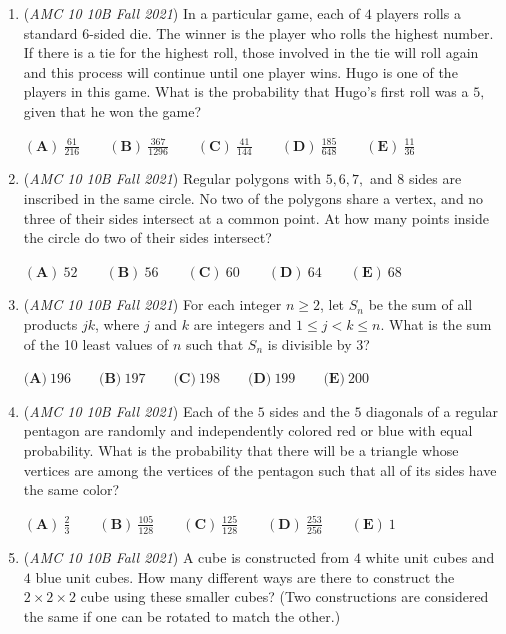 \begin{enumerate}
	\item (\textit{AMC 10 10B Fall 2021}) In a particular game, each of $4$ players rolls a standard $6{ }$-sided die. The winner is the player who rolls the highest number. If there is a tie for the highest roll, those involved in the tie will roll again and this process will continue until one player wins. Hugo is one of the players in this game. What is the probability that Hugo's first roll was a $5,$ given that he won the game?


 $(\textbf{A})\: \frac{61}{216}\qquad(\textbf{B}) \: \frac{367}{1296}\qquad(\textbf{C}) \: \frac{41}{144}\qquad(\textbf{D}) \: \frac{185}{648}\qquad(\textbf{E}) \: \frac{11}{36}$


	\item (\textit{AMC 10 10B Fall 2021}) Regular polygons with $5,6,7,$ and $8$ sides are inscribed in the same circle. No two of the polygons share a vertex, and no three of their sides intersect at a common point. At how many points inside the circle do two of their sides intersect?


 $(\textbf{A})\: 52\qquad(\textbf{B}) \: 56\qquad(\textbf{C}) \: 60\qquad(\textbf{D}) \: 64\qquad(\textbf{E}) \: 68$


	\item (\textit{AMC 10 10B Fall 2021}) For each integer $n\geq 2$, let $S_n$ be the sum of all products $jk$, where $j$ and $k$ are integers and $1\leq j<k\leq n$. What is the sum of the 10 least values of $n$ such that $S_n$ is divisible by $3$?


 $\textbf{(A)}\ 196 \qquad\textbf{(B)}\ 197 \qquad\textbf{(C)}\ 198 \qquad\textbf{(D)}\ 199 \qquad\textbf{(E)}\ 200$


	\item (\textit{AMC 10 10B Fall 2021}) Each of the $5{ }$ sides and the $5{ }$ diagonals of a regular pentagon are randomly and independently colored red or blue with equal probability. What is the probability that there will be a triangle whose vertices are among the vertices of the pentagon such that all of its sides have the same color?


 $(\textbf{A})\: \frac23\qquad(\textbf{B}) \: \frac{105}{128}\qquad(\textbf{C}) \: \frac{125}{128}\qquad(\textbf{D}) \: \frac{253}{256}\qquad(\textbf{E}) \: 1$


	\item (\textit{AMC 10 10B Fall 2021}) A cube is constructed from $4$ white unit cubes and $4$ blue unit cubes. How many different ways are there to construct the $2 \times 2 \times 2$ cube using these smaller cubes? (Two constructions are considered the same if one can be rotated to match the other.)



\end{enumerate}
